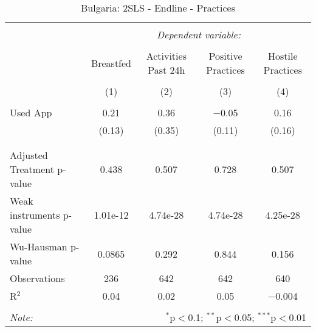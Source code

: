 
\begin{table}[!htbp] \centering 
  \caption{Bulgaria: 2SLS - Endline - Practices} 
  \label{tbl:Bulgaria: 2SLS - Endline - Practices} 
\begin{tabular}{@{\extracolsep{5pt}}lcccc} 
\\[-1.8ex]\hline 
\hline \\[-1.8ex] 
 & \multicolumn{4}{c}{\textit{Dependent variable:}} \\ 
\cline{2-5} 
\\[-1.8ex] & Breastfed & Activities Past 24h & Positive Practices & Hostile Practices \\ 
\\[-1.8ex] & (1) & (2) & (3) & (4)\\ 
\hline \\[-1.8ex] 
 Used App & 0.21 & 0.36 & $-$0.05 & 0.16 \\ 
  & (0.13) & (0.35) & (0.11) & (0.16) \\ 
  & & & & \\ 
\hline \\[-1.8ex] 
Adjusted Treatment p-value & 0.438 & 0.507 & 0.728 & 0.507 \\ 
Weak instruments p-value & 1.01e-12 & 4.74e-28 & 4.74e-28 & 4.25e-28 \\ 
Wu-Hausman p-value & 0.0865 & 0.292 & 0.844 & 0.156 \\ 
Observations & 236 & 642 & 642 & 640 \\ 
R$^{2}$ & 0.04 & 0.02 & 0.05 & $-$0.004 \\ 
\hline 
\hline \\[-1.8ex] 
\textit{Note:}  & \multicolumn{4}{r}{$^{*}$p$<$0.1; $^{**}$p$<$0.05; $^{***}$p$<$0.01} \\ 
\end{tabular} 
\end{table} 

